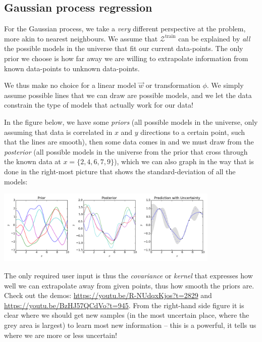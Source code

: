 \documentclass{article}
\begin{document}
\subsection{Gaussian process regression}
For the Gaussian process, we take a \textit{very} different perspective at the problem, more akin to nearest neighbours. We assume that $\mathcal{Z}^\text{train}$ can be explained by \textit{all} the possible models in the universe that fit our current data-points. The only prior we choose is how far away we are willing to extrapolate information from known data-points to unknown data-points.

We thus make no choice for a linear model $\vec{w}$ or transformation $\phi$. We simply assume  possible lines that we can draw are possible models, and we let the data constrain the type of models that actually work for our data!
\begin{testexample}
    In the figure below, we have some \textit{priors} (all possible models in the universe, only assuming that data is correlated in $x$ and $y$ directions to a certain point, such that the lines are smooth), then some data comes in and we must draw from the \textit{posterior} (all possible models in the universe from the prior that cross through the known data at $x=\{2,4,6,7,9\}$), which we can also graph in the way that is done in the right-most picture that shows the standard-deviation of all the models:
    \begin{center}\includegraphics[width=0.8\textwidth]{Gaussian_Process_Regression.png}\end{center}
    {\flushleft The} only required user input is thus the \textit{covariance} or \textit{kernel} that expresses how well we can extrapolate away from given points, thus how smooth the priors are. Check out the demos: \url{https://youtu.be/R-NUdqxKjos?t=2829} and  \url{https://youtu.be/BzHJ57QCdVo?t=945}. From the right-hand side figure it is clear where we should get new samples (in the most uncertain place, where the grey area is largest) to learn most new information -- this is a powerful, it tells us where we are more or less uncertain!
\end{testexample}
\end{document}
